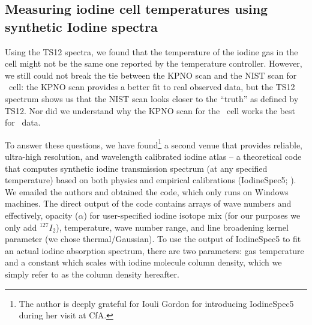 \subsection{Measuring iodine cell temperatures using synthetic Iodine spectra}

Using the TS12 spectra, we found that the temperature of the iodine
gas in the cell might not be the same one reported by the temperature
controller. However, we still could not break the tie between the KPNO
scan and the NIST scan for \het\ cell: the KPNO scan provides a better
fit to real observed data, but the TS12 spectrum shows us that the
NIST scan looks closer to the ``truth'' as defined by TS12. Nor did we
understand why the KPNO scan for the \keck\ cell works the best for
\het\ data.

To answer these questions, we have found\footnote{The author is deeply
  grateful for Iouli Gordon for introducing IodineSpec5
  during her visit at CfA.} a second venue that provides
reliable, ultra-high resolution, and wavelength calibrated iodine
atlas -- a theoretical code that computes synthetic iodine
transmission spectrum (at any specified temperature) based on both
physics and empirical calibrations (IodineSpec5;
\citealt{iodinespec5}). We emailed the authors and obtained the code,
which only runs on Windows machines. The direct output of the code
contains arrays of wave numbers and effectively, opacity ($\alpha$) for user-specified
iodine isotope mix (for our purposes we only add $^{127}I_2$),
temperature, wave number range, and line broadening kernel parameter
(we chose thermal/Gaussian). To use the output of IodineSpec5 to fit
an actual iodine absorption spectrum, there are two parameters:
gas temperature and a constant which scales with iodine molecule
column density, which we simply refer to as the column density hereafter.

